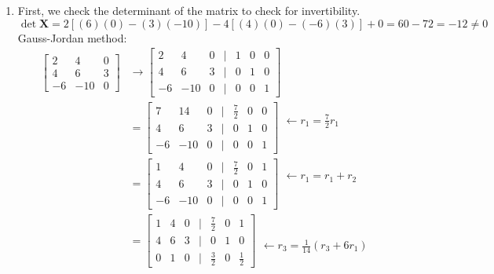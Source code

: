 \documentclass[12pt]{article}
\begin{document}
\begin{enumerate}
    \item First, we check the determinant of the matrix to check for invertibility. 
    \[ \det \mathbf{X} = 2\left[(6)(0) - (3)(-10)\right] -4\left[(4)(0) - (-6)(3)\right] + 0 = 60 - 72 =-12\neq 0\]
    Gauss-Jordan method:
    \begin{align*}
            \begin{bmatrix}
        2&4&0 \\ 4&6&3\\ -6&-10&0\end{bmatrix} 
        & \to \begin{bmatrix}
        2&4&0 &|& 1&0&0
        \\ 4&6&3 &|& 0&1&0
        \\ -6&-10&0 &|& 0&0&1
        \end{bmatrix}
        \\ &= \begin{bmatrix}
            7& 14 &0 &|& \frac{7}{2} & 0&0
            \\ 4&6&3 &|& 0&1&0
            \\ -6&-10&0 &|& 0&0&1
            \end{bmatrix} \begin{matrix} \leftarrow r_1=\frac{7}{2}r_1   \\ \\ \\ \end{matrix}
        \\ &= \begin{bmatrix}
            1& 4 &0 &|& \frac{7}{2} & 0&1
            \\ 4&6&3 &|& 0&1&0
            \\ -6&-10&0 &|& 0&0&1
            \end{bmatrix} \begin{matrix} \leftarrow r_1=r_1+r_2   \\ \\ \\ \end{matrix}  
        \\ &= \begin{bmatrix}
            1& 4 &0 &|& \frac{7}{2} & 0&1
            \\ 4&6&3 &|& 0&1&0
            \\ 0& 1 &0 &|& \frac{3}{2}&0&\frac{1}{2}
            \end{bmatrix} \begin{matrix}  \\ \\ \leftarrow r_3=\frac{1}{14}(r_3+6r_1)   \end{matrix}  

\end{align*}
\end{enumerate}
\end{document}
